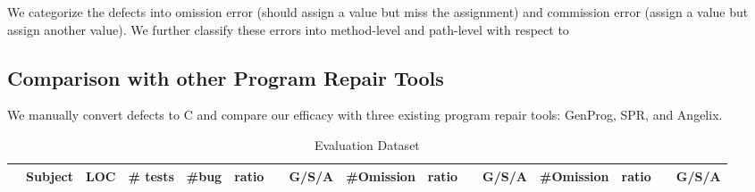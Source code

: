   We categorize the defects into omission error (should assign a value but miss the assignment) and commission error (assign a value but assign another value). We further classify these errors into method-level and path-level  with respect to 



\subsection{Comparison with other Program Repair Tools}  

We manually convert defects to C and compare our efficacy with three existing program repair tools: GenProg, SPR, and Angelix. 

\begin{table*}[ht]
\begin{center}
\caption{Evaluation Dataset }
\label{tab:evalSubject}
\vspace{1mm}
\scriptsize{
\begin{tabular*}{1\textwidth}{@{}c|r|cc|cccc|cccc|cccc@{}} 
&Subject		&LOC	&\# tests 	&\#bug	& ratio	&\tool&G/S/A	&\#Omission & ratio	&\tool&G/S/A	&\#Omission & ratio	&\tool&G/S/A		 \\\midrule
\end{tabular*}
 \label{tab:dataset}
}
 \end{center}
\end{table*}